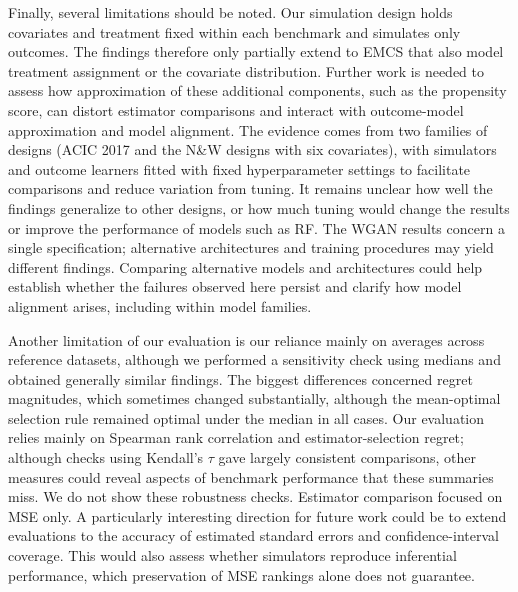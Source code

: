 Finally, several limitations should be noted. Our simulation design holds covariates and treatment fixed within each benchmark and simulates only outcomes. The findings therefore only partially extend to EMCS that also model treatment assignment or the covariate distribution. Further work is needed to assess how approximation of these additional components, such as the propensity score, can distort estimator comparisons and interact with outcome-model approximation and model alignment. The evidence comes from two families of designs (ACIC 2017 and the N\&W designs with six covariates), with simulators and outcome learners fitted with fixed hyperparameter settings to facilitate comparisons and reduce variation from tuning. It remains unclear how well the findings generalize to other designs, or how much tuning would change the results or improve the performance of models such as RF. The WGAN results concern a single specification; alternative architectures and training procedures may yield different findings. Comparing alternative models and architectures could help establish whether the failures observed here persist and clarify how model alignment arises, including within model families.

Another limitation of our evaluation is our reliance mainly on averages across reference datasets, although we performed a sensitivity check using medians and obtained generally similar findings. The biggest differences concerned regret magnitudes, which sometimes changed substantially, although the mean-optimal selection rule remained optimal under the median in all cases. Our evaluation relies mainly on Spearman rank correlation and estimator-selection regret; although checks using Kendall's \(\tau\) gave largely consistent comparisons, other measures could reveal aspects of benchmark performance that these summaries miss. We do not show these robustness checks. Estimator comparison focused on MSE only. A particularly interesting direction for future work could be to extend evaluations to the accuracy of estimated standard errors and confidence-interval coverage. This would also assess whether simulators reproduce inferential performance, which preservation of MSE rankings alone does not guarantee.
